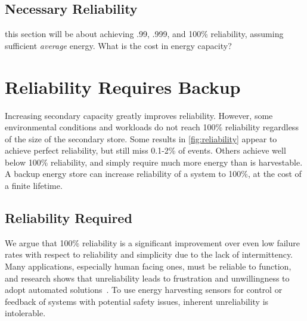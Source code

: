 \subsection{Necessary Reliability}
this section will be about achieving .99, .999, and 100\% reliability, assuming sufficient \textit{average} energy. What is the cost in energy capacity?

\section{Reliability Requires Backup}
\label{sec:primary}

Increasing secondary capacity greatly improves
reliability.
However, some environmental
conditions and workloads do not reach 100\% reliability regardless of the size
of the secondary store.
Some results in \cref{fig:reliability}
appear to achieve perfect reliability, but still miss 0.1-2\% of events.
Others achieve well below 100\% reliability, %
and simply require much more energy
than is harvestable. A backup energy store can increase reliability of a system
to 100\%, at the cost of a finite lifetime.

\subsection{Reliability Required}
\label{sec:primary:reliability}

We argue that 100\% reliability is a significant improvement over
even low failure rates with respect to reliability
and simplicity due to the lack of intermittency.
Many applications, especially human facing ones,
must be reliable to function, and research shows that unreliability
leads to frustration and %
unwillingness to adopt automated solutions~\cite{brushHome11, edwardsHome01, shehanHome07}.
To use energy harvesting sensors for control or feedback of systems with potential
safety issues, inherent unreliability is intolerable.

